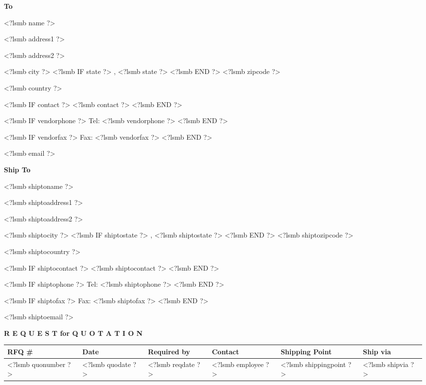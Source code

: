 \documentclass{scrartcl}
\begin{document}
\parbox[t]{.5\textwidth}{
\textbf{To}
\vspace{0.3cm}
  
<?lsmb name ?>

<?lsmb address1 ?>

<?lsmb address2 ?>

<?lsmb city ?>
<?lsmb IF state ?>
\hspace{-0.1cm}, <?lsmb state ?>
<?lsmb END ?>
<?lsmb zipcode ?>

<?lsmb country ?>

\vspace{0.3cm}

<?lsmb IF contact ?>
<?lsmb contact ?>
\vspace{0.2cm}
<?lsmb END ?>

<?lsmb IF vendorphone ?>
Tel: <?lsmb vendorphone ?>
<?lsmb END ?>

<?lsmb IF vendorfax ?>
Fax: <?lsmb vendorfax ?>
<?lsmb END ?>

<?lsmb email ?>
}
\parbox[t]{.5\textwidth}{
\textbf{Ship To}
\vspace{0.3cm}

<?lsmb shiptoname ?>

<?lsmb shiptoaddress1 ?>

<?lsmb shiptoaddress2 ?>

<?lsmb shiptocity ?>
<?lsmb IF shiptostate ?>
\hspace{-0.1cm}, <?lsmb shiptostate ?>
<?lsmb END ?>
<?lsmb shiptozipcode ?>

<?lsmb shiptocountry ?>

\vspace{0.3cm}

<?lsmb IF shiptocontact ?>
<?lsmb shiptocontact ?>
\vspace{0.2cm}
<?lsmb END ?>

<?lsmb IF shiptophone ?>
Tel: <?lsmb shiptophone ?>
<?lsmb END ?>

<?lsmb IF shiptofax ?>
Fax: <?lsmb shiptofax ?>
<?lsmb END ?>

<?lsmb shiptoemail ?>
}
\hfill

\vspace{1cm}

\textbf{R E Q U E S T for Q U O T A T I O N}
\hfill

\vspace{1cm}

\begin{tabularx}{\textwidth}{*{6}{|X}|} \hline
  \textbf{RFQ \#} & \textbf{Date} & \textbf{Required by} & \textbf{Contact} & \textbf{Shipping Point} & \textbf{Ship via} \\ [0.5ex]
  \hline
  <?lsmb quonumber ?> & <?lsmb quodate ?> & <?lsmb reqdate ?> & <?lsmb employee ?> & <?lsmb shippingpoint ?> & <?lsmb shipvia ?> \\
  \hline
\end{tabularx}
\end{document}
